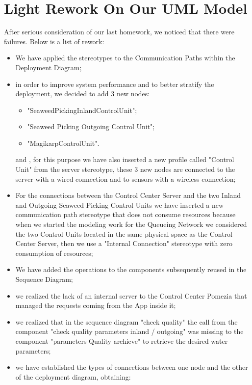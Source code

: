 \newpage \chapter{\textbf{Light Rework On Our UML Model}}

After serious consideration of our last homework, we noticed that there were failures. Below is a list of rework:

\begin{itemize}
	\item We have applied the stereotypes to the Communication Paths 		within the Deployment Diagram;
	\item in order to improve system performance and to better 				stratify the deployment, we decided to add 3 new nodes: 
	\begin{itemize}
	\item "SeaweedPickingInlandControlUnit";
	\item "Seaweed Picking Outgoing Control Unit";
	\item "MagikarpControlUnit".
	\end{itemize}					 
	and , for this purpose we have also inserted a new profile called 		"Control Unit" from the	server 	stereotype, these 3 new nodes are 		connected to the server with a wired connection and to sensors 			with a wireless connection;
	\item For the connections between the Control Center Server and 		the	two Inland and Outgoing Seaweed Picking Control Units we 			have inserted a new communication path stereotype that does 			not consume resources because when we started the modeling 				work for the Queueing Network we considered the two Control 			Units located in the same physical space as the Control 				Center Server, then we use a "Internal Connection" stereotype with 	zero consumption of resources;
	\item We have added the operations to the components subsequently 		reused in the Sequence Diagram;
	\item we realized the lack of an internal server to the Control 		Center 	Pomezia that managed the requests coming from the App 			inside it;
	\item we realized that in the sequence diagram "check quality" the 	call from the component "check quality parameters inland /				outgoing" was missing to the component "parameters Quality 				archieve" to retrieve the desired water parameters;
	\item we have established the types of connections between one 			node and the other of the deployment diagram, obtaining:
	

\end{itemize}
